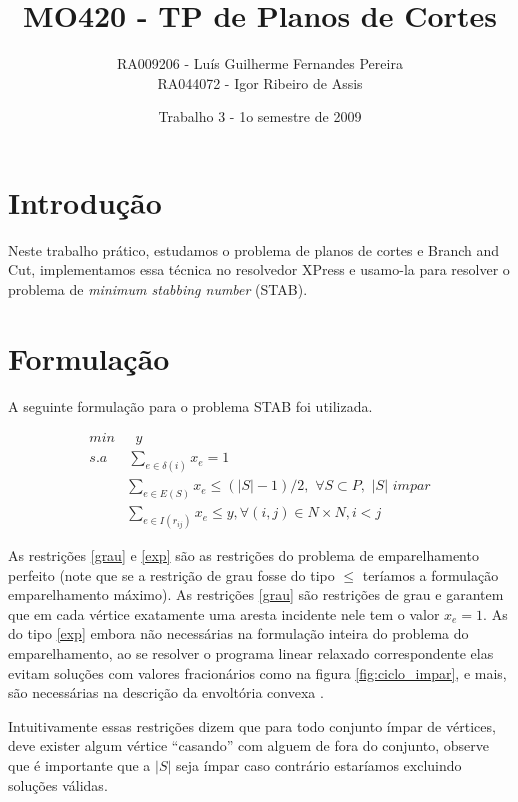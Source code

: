 \documentclass[11pt]{article}
\title{MO420 - TP de Planos de Cortes}
\author{RA009206 - Luís Guilherme Fernandes Pereira \\
RA044072 - Igor Ribeiro de Assis}
\date{Trabalho 3 - 1o semestre de 2009}
\begin{document}
\maketitle

\section{Introdução}

Neste trabalho prático, estudamos o problema de planos de cortes e
Branch and Cut, implementamos essa técnica no resolvedor XPress e
usamo-la para resolver o problema de \emph{minimum stabbing number}
(STAB).

\section{Formulação}

A seguinte formulação para o problema STAB foi utilizada.

\begin{align}
 min & \hspace{8pt}y\\
  s.a & \hspace{2pt}\sum_{e \in \delta (i)}{x_e} = 1 \label{grau} \\
      & \sum_{e \in E(S)}{x_e} \le (|S|-1)/2, \hspace{4pt} \forall S
  \subset P, \hspace{4pt} |S|
  \hspace{4pt} impar \label{exp} \\
      & \sum_{e \in I(r_{ij})}{x_e} \le y, \forall (i,j) \in N \times N,
    i < j \label{inter}
\end{align}

As restrições \eqref{grau} e \eqref{exp} são as restrições do problema
de emparelhamento perfeito (note que se a restrição de grau fosse do
tipo $\le$ teríamos a formulação emparelhamento máximo). As restrições
\eqref{grau} são restrições de grau e garantem que em cada vértice
exatamente uma aresta incidente nele tem o valor $x_e = 1$. As do tipo
\eqref{exp} embora não necessárias na formulação inteira do problema
do emparelhamento, ao se resolver o programa linear relaxado
correspondente elas evitam soluções com valores fracionários como na
figura \ref{fig:ciclo_impar}, e mais, são necessárias na descrição da
envoltória convexa \cite{grotschel1985smp}.

Intuitivamente essas restrições dizem que para todo conjunto ímpar de
vértices, deve exister algum vértice ``casando'' com alguem de fora do
conjunto, observe que é importante que a $|S|$ seja ímpar caso
contrário estaríamos excluindo soluções válidas.
\end{document}
